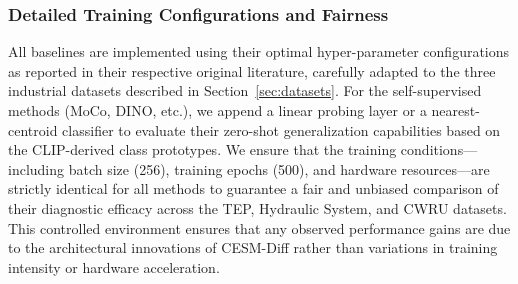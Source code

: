 \subsubsection{Detailed Training Configurations and Fairness}
All baselines are implemented using their optimal hyper-parameter configurations as reported in their respective original literature, carefully adapted to the three industrial datasets described in Section~\ref{sec:datasets}. For the self-supervised methods (MoCo, DINO, etc.), we append a linear probing layer or a nearest-centroid classifier to evaluate their zero-shot generalization capabilities based on the CLIP-derived class prototypes. We ensure that the training conditions—including batch size (256), training epochs (500), and hardware resources—are strictly identical for all methods to guarantee a fair and unbiased comparison of their diagnostic efficacy across the TEP, Hydraulic System, and CWRU datasets. This controlled environment ensures that any observed performance gains are due to the architectural innovations of CESM-Diff rather than variations in training intensity or hardware acceleration.
